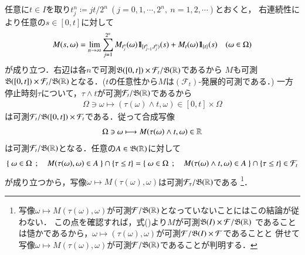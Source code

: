	\begin{prf}
		任意に$t \in I$を取り$t_j^n \coloneqq jt/2^n\ (j=0,1,\cdots,2^n,\ n=1,2,\cdots)$とおくと，
		右連続性により任意の$s \in [0,t]$に対して
		\begin{align}
			M(s,\omega) = \lim_{n \to \infty} \sum_{j=1}^{2^n} M_{t_j^n}(\omega) \mbox{1}\hspace{-0.25em}\mbox{l}_{[t_{j-1}^n,t_j^n)}(s) + M_t(\omega) \mbox{1}\hspace{-0.25em}\mbox{l}_{\{t\}}(s) \quad (\omega \in \Omega)
			\label{eq:stopping_time_measurability}
		\end{align}
		が成り立つ．右辺は各$n$で可測$\mathfrak{B}([0,t]) \times \mathcal{F}_t/\mathfrak{B}(\mathbb{R})$であるから
		$M$も可測$\mathfrak{B}([0,t]) \times \mathcal{F}_t/\mathfrak{B}(\mathbb{R})$となる．($t$の任意性から$M$は$(\mathcal{F}_t)$-発展的可測である．)
		一方停止時刻$\tau$について，$\tau \wedge t$が可測$\mathcal{F}_t/\mathfrak{B}(\mathbb{R})$であるから
		\begin{align}
			\Omega \ni \omega \longmapsto (\tau(\omega) \wedge t, \omega) \in [0,t] \times \Omega
		\end{align}
		は可測$\mathcal{F}_t/\mathfrak{B}([0,t]) \times \mathcal{F}_t$である．従って合成写像
		\begin{align}
			\Omega \ni \omega \longmapsto M(\tau(\omega) \wedge t,\omega) \in \mathbb{R}
		\end{align}
		は可測$\mathcal{F}_t/\mathfrak{B}(\mathbb{R})$となる．任意の$A \in \mathfrak{B}(\mathbb{R})$に対して
		\begin{align}
			\left\{\ \omega \in \Omega\ \, ; \quad M(\tau(\omega),\omega) \in A\ \right\} \cap \left\{ \tau \leq t \right\}
			= \left\{\ \omega \in \Omega\ \, ; \quad M(\tau(\omega) \wedge t,\omega) \in A\ \right\} \cap \left\{ \tau \leq t \right\}
			\in \mathcal{F}_t
		\end{align}
		が成り立つから，写像$\omega \longmapsto M(\tau(\omega),\omega)$は可測$\mathcal{F}_\tau/\mathfrak{B}(\mathbb{R})$である
		\footnote{
			写像$\omega \longmapsto M(\tau(\omega),\omega)$が可測$\mathcal{F}/\mathfrak{B}(\mathbb{R})$となっていないことにはこの結論が従わない．
			この点を確認すれば，式()より$M$が可測$\mathfrak{B}(I) \times \mathcal{F}/\mathfrak{B}(\mathbb{R})$
			であることは慥かであるから，$\omega \longmapsto (\tau(\omega),\omega)$が可測$\mathcal{F}/\mathfrak{B}(I)\times\mathcal{F}$であることと
			併せて写像$\omega \longmapsto M(\tau(\omega),\omega)$が可測$\mathcal{F}/\mathfrak{B}(\mathbb{R})$であることが判明する．
		}．
		\QED
	\end{prf}
	
